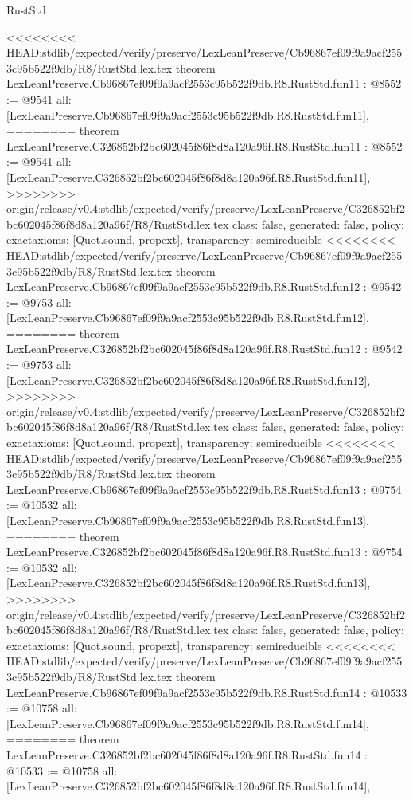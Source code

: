 \begin{lexlean}{RustStd}
\begin{coremodule}
{\begin{coremodule}
{{{{{{{{{{{{{{}
<<<<<<<< HEAD:stdlib/expected/verify/preserve/LexLeanPreserve/Cb96867ef09f9a9acf2553c95b522f9db/R8/RustStd.lex.tex
theorem LexLeanPreserve.Cb96867ef09f9a9acf2553c95b522f9db.R8.RustStd.fun11 : @8552 := @9541 {
  all: [LexLeanPreserve.Cb96867ef09f9a9acf2553c95b522f9db.R8.RustStd.fun11],
========
theorem LexLeanPreserve.C326852bf2bc602045f86f8d8a120a96f.R8.RustStd.fun11 : @8552 := @9541 {
  all: [LexLeanPreserve.C326852bf2bc602045f86f8d8a120a96f.R8.RustStd.fun11],
>>>>>>>> origin/release/v0.4:stdlib/expected/verify/preserve/LexLeanPreserve/C326852bf2bc602045f86f8d8a120a96f/R8/RustStd.lex.tex
  class: false,
  generated: false,
  policy: exact{axioms: [Quot.sound, propext]},
  transparency: semireducible
}
<<<<<<<< HEAD:stdlib/expected/verify/preserve/LexLeanPreserve/Cb96867ef09f9a9acf2553c95b522f9db/R8/RustStd.lex.tex
theorem LexLeanPreserve.Cb96867ef09f9a9acf2553c95b522f9db.R8.RustStd.fun12 : @9542 := @9753 {
  all: [LexLeanPreserve.Cb96867ef09f9a9acf2553c95b522f9db.R8.RustStd.fun12],
========
theorem LexLeanPreserve.C326852bf2bc602045f86f8d8a120a96f.R8.RustStd.fun12 : @9542 := @9753 {
  all: [LexLeanPreserve.C326852bf2bc602045f86f8d8a120a96f.R8.RustStd.fun12],
>>>>>>>> origin/release/v0.4:stdlib/expected/verify/preserve/LexLeanPreserve/C326852bf2bc602045f86f8d8a120a96f/R8/RustStd.lex.tex
  class: false,
  generated: false,
  policy: exact{axioms: [Quot.sound, propext]},
  transparency: semireducible
}
<<<<<<<< HEAD:stdlib/expected/verify/preserve/LexLeanPreserve/Cb96867ef09f9a9acf2553c95b522f9db/R8/RustStd.lex.tex
theorem LexLeanPreserve.Cb96867ef09f9a9acf2553c95b522f9db.R8.RustStd.fun13 : @9754 := @10532 {
  all: [LexLeanPreserve.Cb96867ef09f9a9acf2553c95b522f9db.R8.RustStd.fun13],
========
theorem LexLeanPreserve.C326852bf2bc602045f86f8d8a120a96f.R8.RustStd.fun13 : @9754 := @10532 {
  all: [LexLeanPreserve.C326852bf2bc602045f86f8d8a120a96f.R8.RustStd.fun13],
>>>>>>>> origin/release/v0.4:stdlib/expected/verify/preserve/LexLeanPreserve/C326852bf2bc602045f86f8d8a120a96f/R8/RustStd.lex.tex
  class: false,
  generated: false,
  policy: exact{axioms: [Quot.sound, propext]},
  transparency: semireducible
}
<<<<<<<< HEAD:stdlib/expected/verify/preserve/LexLeanPreserve/Cb96867ef09f9a9acf2553c95b522f9db/R8/RustStd.lex.tex
theorem LexLeanPreserve.Cb96867ef09f9a9acf2553c95b522f9db.R8.RustStd.fun14 : @10533 := @10758 {
  all: [LexLeanPreserve.Cb96867ef09f9a9acf2553c95b522f9db.R8.RustStd.fun14],
========
theorem LexLeanPreserve.C326852bf2bc602045f86f8d8a120a96f.R8.RustStd.fun14 : @10533 := @10758 {
  all: [LexLeanPreserve.C326852bf2bc602045f86f8d8a120a96f.R8.RustStd.fun14],
}}}}}}}}}}}}}}}}}}
\end{coremodule}}
\end{coremodule}
\end{lexlean}
